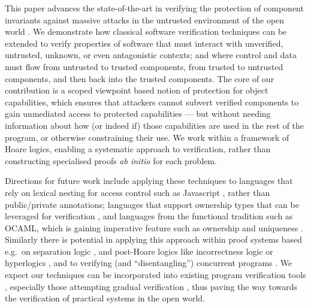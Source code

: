 
This paper advances the state-of-the-art in verifying the protection
of component invariants against massive
attacks \cite{massive-attack-protection} in the untrusted environment
of the open world \cite{baresi2006toward,swapsies}.
%
We demonstrate how classical software verification techniques
can be extended to verify properties of software that must
interact with unverified, untrusted, unknown, or even antagonistic
contexts; and where control and data must flow from untrusted to
trusted components, from trusted to untrusted components, and then
back into the trusted components.
%
The core of our contribution is a scoped viewpoint based notion of
protection for object capabilities, which ensures that attackers
cannot subvert verified components to gain unmediated access to
protected capabilities --- but without needing information about how (or
indeed if) those capabilities are used in the rest of the program, or
otherwise constraining their use.  We work within a framework of Hoare
logics, enabling a systematic approach to
verification, rather than constructing specialised proofs \textit{ab
initio} for each problem. 


Directions for future work include applying these techniques to
languages that rely on lexical nesting for access
control such as Javascript \cite{ooToSecurity},
rather than public/private annotations;
languages that support ownership types that can be leveraged for
verification
\cite{leveragingRust-oopsla2019,RustHornBelt-pldi2022,verus-oopsla2023},
and languages from the
functional tradition such as OCAML, which is gaining imperative
feature such as ownership and uniqueness \cite{funk-ownership-oopsla2024,ocaml-ownership-icfp2024}. 
%
Similarly there is potential in applying this approach within
proof systems based e.g.\ on separation logic \cite{cerise-jacm2024},
and post-Hoare logics like incorrectness logic \cite{IncorrectnessLogic} or
hyperlogics \cite{compositional-hypersafety-oopsla2022,hyper-hoare-pldi2024},
and to verifying (and ``disentangling'') concurrent programs \cite{seplog-disentanglelment-popl2024}.
%
We expect our techniques can be incorporated into existing program
verification tools \cite{Cok2022}, especially those attempting
gradual verification \cite{gradual-verification-popl2024},
thus paving the way towards the verification of
practical systems in the open world.






